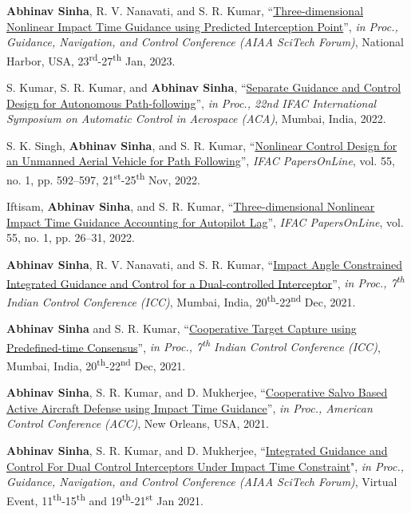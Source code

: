 {\begin{etaremune}[leftmargin=1cm]
		\item \textbf{Abhinav Sinha}, R. V. Nanavati, and S. R. Kumar, ``\href{https://arc.aiaa.org/doi/10.2514/6.2023-2496}{Three-dimensional Nonlinear Impact Time Guidance using Predicted Interception Point}'', \emph{in Proc., Guidance, Navigation, and Control Conference (AIAA SciTech Forum)}, National Harbor, USA, 23\textsuperscript{rd}-27\textsuperscript{th} Jan, 2023.
		\item S. Kumar, S. R. Kumar, and \textbf{Abhinav Sinha}, ``\href{https://www.sciencedirect.com/science/article/pii/S240589632300294X}{Separate Guidance and Control Design for Autonomous Path-following}'', \emph{in Proc., 22nd IFAC International Symposium on Automatic Control in Aerospace (ACA)}, Mumbai, India, 2022.
		\item S. K. Singh, \textbf{Abhinav Sinha}, and S. R. Kumar, ``\href{https://www.sciencedirect.com/science/article/pii/S2405896322000970}{Nonlinear Control Design for an Unmanned Aerial Vehicle for Path Following}'', \emph{IFAC PapersOnLine}, vol. 55, no. 1, pp. 592--597, 21\textsuperscript{st}-25\textsuperscript{th} Nov, 2022.
		\item Iftisam, \textbf{Abhinav Sinha}, and S. R. Kumar, ``\href{https://www.sciencedirect.com/science/article/pii/S2405896322000052}{Three-dimensional Nonlinear Impact Time Guidance Accounting for Autopilot Lag}'', \emph{IFAC PapersOnLine}, vol. 55, no. 1, pp. 26--31, 2022.
		\item \textbf{Abhinav Sinha}, R. V. Nanavati, and S. R. Kumar, ``\href{https://ieeexplore.ieee.org/abstract/document/9703136}{Impact Angle Constrained Integrated Guidance and Control for a Dual-controlled Interceptor}'', \emph{in Proc., 7\textsuperscript{th} Indian Control Conference (ICC)}, Mumbai, India, 20\textsuperscript{th}-22\textsuperscript{nd} Dec, 2021.
		\item \textbf{Abhinav Sinha} and S. R. Kumar, ``\href{https://ieeexplore.ieee.org/abstract/document/9703170}{Cooperative Target Capture using Predefined-time Consensus}'', \emph{in Proc., 7\textsuperscript{th} Indian Control Conference (ICC)}, Mumbai, India, 20\textsuperscript{th}-22\textsuperscript{nd} Dec, 2021.
		\item \textbf{Abhinav Sinha}, S. R. Kumar, and D. Mukherjee, ``\href{https://ieeexplore.ieee.org/abstract/document/9482897}{Cooperative Salvo Based Active Aircraft Defense using Impact Time Guidance}'', \emph{in Proc., American Control Conference (ACC)}, New Orleans, USA, 2021.
		\item \textbf{Abhinav Sinha}, S. R. Kumar, and D. Mukherjee, ``\href{https://arc.aiaa.org/doi/abs/10.2514/6.2021-1463}{Integrated Guidance and Control For Dual Control Interceptors Under Impact Time Constraint}", \emph{in Proc., Guidance, Navigation, and Control Conference (AIAA SciTech Forum)}, Virtual Event, 11\textsuperscript{th}-15\textsuperscript{th} and 19\textsuperscript{th}-21\textsuperscript{st} Jan 2021.

\end{etaremune}}
